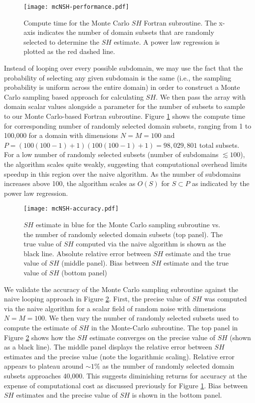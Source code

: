 \begin{figure}[h]
	\centering
	\texttt{[image: mcNSH-performance.pdf]}
	\caption{Compute time for the Monte Carlo $SH$ Fortran subroutine. The x-axis indicates the number of domain subsets that are randomly selected to determine the $SH$ estimate. A power law regression is plotted as the red dashed line.}
	\label{fig:mcsh-performance}
\end{figure}

Instead of looping over every possible subdomain, we may use the fact that the probability of selecting any given subdomain is the same (i.e., the sampling probability is uniform across the entire domain) in order to construct a Monte Carlo sampling based approach for calculating $SH$. We then pass the array with domain scalar values alongside a parameter for the number of subsets to sample to our Monte Carlo-based Fortran subroutine. Figure \ref{fig:mcsh-performance} shows the compute time for corresponding number of randomly selected domain subsets, ranging from 1 to 100,000 for a domain with dimensions $N=M=100$ and $P=(100(100-1)+1)(100(100-1)+1) = 98,029,801$ total subsets. For a low number of randomly selected subsets (number of subdomains $\lesssim 100$), the algorithm scales quite weakly, suggesting that computational overhead limits speedup in this region over the naive algorithm. As the number of subdomains increases above 100, the algorithm scales as $O(S)$ for $S\subset P$ as indicated by the power law regression.

\begin{figure}[h]
	\centering
	\texttt{[image: mcNSH-accuracy.pdf]}
	\caption{$SH$ estimate in blue for the Monte Carlo sampling subroutine vs. the number of randomly selected domain subsets (top panel). The true value of $SH$ computed via the naive algorithm is shown as the black line.  Absolute relative error between $SH$ estimate and the true value of $SH$ (middle panel). Bias between $SH$ estimate and the true value of $SH$ (bottom panel) }
	\label{fig:mcsh-accuracy}
\end{figure}

We validate the accuracy of the Monte Carlo sampling subroutine against the naive looping approach in Figure \ref{fig:mcsh-accuracy}. First, the precise value of $SH$ was computed via the naive algorithm for a scalar field of random noise with dimensions $N=M=100$. We then vary the number of randomly selected subsets used to compute the estimate of $SH$ in the Monte-Carlo subroutine. The top panel in Figure \ref{fig:mcsh-accuracy} shows how the $SH$ estimate converges on the precise value of $SH$ (shown as a black line). The middle panel displays the relative error between $SH$ estimates and the precise value (note the logarithmic scaling). Relative error appears to plateau around $\sim1\%$ as the number of randomly selected domain subsets approaches 40,000. This suggests diminishing returns for accuracy at the expense of computational cost as discussed previously for Figure \ref{fig:mcsh-performance}. Bias between $SH$ estimates and the precise value of $SH$ is shown in the bottom panel. 

